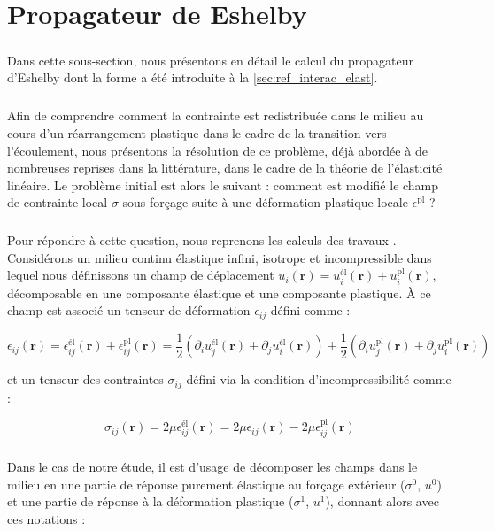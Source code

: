 \section{Propagateur de Eshelby}

\label{sec:Annexe_Eshelby}

\subparagraph{}Dans cette sous-section, nous présentons en détail le calcul du propagateur d'Eshelby dont la forme a été introduite à la \autoref{sec:ref_interac_elast}.

\subparagraph{}Afin de comprendre comment la contrainte est redistribuée dans le milieu au cours d'un réarrangement plastique dans le cadre de la transition vers l'écoulement, nous présentons la résolution de ce problème, déjà abordée à de nombreuses reprises dans la littérature, dans le cadre de la théorie de l'élasticité linéaire. Le problème initial est alors le suivant : comment est modifié le champ de contrainte local $\sigma$ sous forçage suite à une déformation plastique locale $\epsilon^\text{pl}$ ?

\subparagraph{}Pour répondre à cette question, nous reprenons les calculs des travaux \cite{picard_elastic_2004, goff_flow_2021}. Considérons un milieu continu élastique infini, isotrope et incompressible dans lequel nous définissons un champ de déplacement $u_i(\mathbf{r}) = u_i^\text{él}(\mathbf{r}) + u_i^\text{pl}(\mathbf{r})$, décomposable en une composante élastique et une composante plastique. \`A ce champ est associé un tenseur de déformation $\epsilon_{ij}$ défini comme :

\begin{equation}
	\epsilon_{ij}(\mathbf{r}) = \epsilon^\text{él}_{ij}(\mathbf{r})+\epsilon^\text{pl}_{ij}(\mathbf{r}) = \frac{1}{2}\left( \partial_i u_j^\text{él}(\mathbf{r}) + \partial_j u_i^\text{él}(\mathbf{r}) \right) + \frac{1}{2}\left( \partial_i u_j^\text{pl}(\mathbf{r}) + \partial_j u_i^\text{pl}(\mathbf{r}) \right)
	\label{eq:tenseurdeformation}
\end{equation}

et un tenseur des contraintes $\sigma_{ij}$ défini via la condition d'incompressibilité comme :

\begin{equation}
	\sigma_{ij}(\mathbf{r}) = 2\mu\epsilon^\text{él}_{ij}(\mathbf{r}) = 2\mu\epsilon_{ij}(\mathbf{r}) - 2\mu \epsilon^\text{pl}_{ij}(\mathbf{r})
	\label{eq:tenseurcontrainte}
\end{equation}

\subparagraph{}Dans le cas de notre étude, il est d'usage de décomposer les champs dans le milieu en une partie de réponse purement élastique au forçage extérieur ($\sigma^0$, $u^0$) et une partie de réponse à la déformation plastique ($\sigma^1$, $u^1$), donnant alors avec ces notations :

